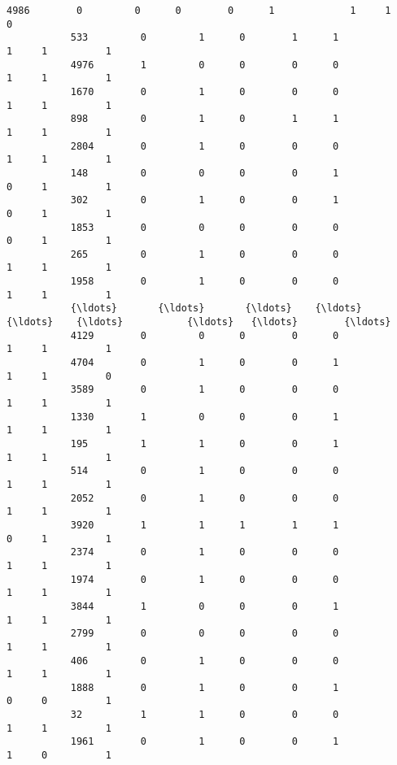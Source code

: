\documentclass[11pt]{article}
\begin{document}
\begin{Verbatim}[commandchars=\\\{\}]
           4986        0         0      0        0      1             1     1          0   
           533         0         1      0        1      1             1     1          1   
           4976        1         0      0        0      0             1     1          1   
           1670        0         1      0        0      0             1     1          1   
           898         0         1      0        1      1             1     1          1   
           2804        0         1      0        0      0             1     1          1   
           148         0         0      0        0      1             0     1          1   
           302         0         1      0        0      1             0     1          1   
           1853        0         0      0        0      0             0     1          1   
           265         0         1      0        0      0             1     1          1   
           1958        0         1      0        0      0             1     1          1   
           {\ldots}       {\ldots}       {\ldots}    {\ldots}      {\ldots}    {\ldots}           {\ldots}   {\ldots}        {\ldots}   
           4129        0         0      0        0      0             1     1          1   
           4704        0         1      0        0      1             1     1          0   
           3589        0         1      0        0      0             1     1          1   
           1330        1         0      0        0      1             1     1          1   
           195         1         1      0        0      1             1     1          1   
           514         0         1      0        0      0             1     1          1   
           2052        0         1      0        0      0             1     1          1   
           3920        1         1      1        1      1             0     1          1   
           2374        0         1      0        0      0             1     1          1   
           1974        0         1      0        0      0             1     1          1   
           3844        1         0      0        0      1             1     1          1   
           2799        0         0      0        0      0             1     1          1   
           406         0         1      0        0      0             1     1          1   
           1888        0         1      0        0      1             0     0          1   
           32          1         1      0        0      0             1     1          1   
           1961        0         1      0        0      1             1     0          1   

\end{Verbatim}
\end{document}
